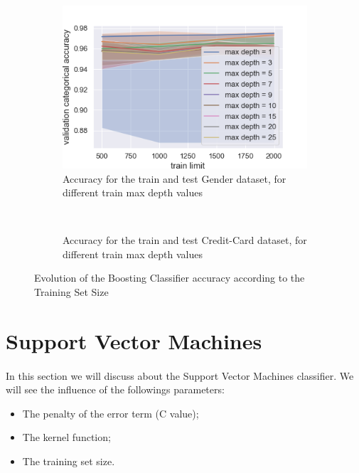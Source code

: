 \documentclass[10pt]{article}
\begin{document}
		\paragraph*{}
			\begin{figure}[h]
				\centering
				\begin{subfigure}[]{0.45\columnwidth}
					\centering
					\includegraphics[width=\linewidth]{../graphics/boost_gender_train_limit_score_type_max_depth.png}
					\caption{Accuracy for the train and test Gender dataset, for different train max depth values}
					\label{boost_sc_train_limit}
				\end{subfigure}
				~
				\begin{subfigure}[]{0.45\columnwidth}
					\centering
					\caption{Accuracy for the train and test Credit-Card dataset, for different train max depth values}
					\label{boost_cc_train_limit}
				\end{subfigure}
				\caption{Evolution of the Boosting Classifier accuracy according to the Training Set Size}
				\label{boost_train_limit}
			\end{figure}
	\section{Support Vector Machines}
		\paragraph*{}
			In this section we will discuss about the Support Vector Machines classifier. We will see the influence of the followings parameters:
			\begin{itemize}
				\item The penalty of the error term (C value);
				\item The kernel function;
				\item The training set size.
			\end{itemize}
\end{document}
